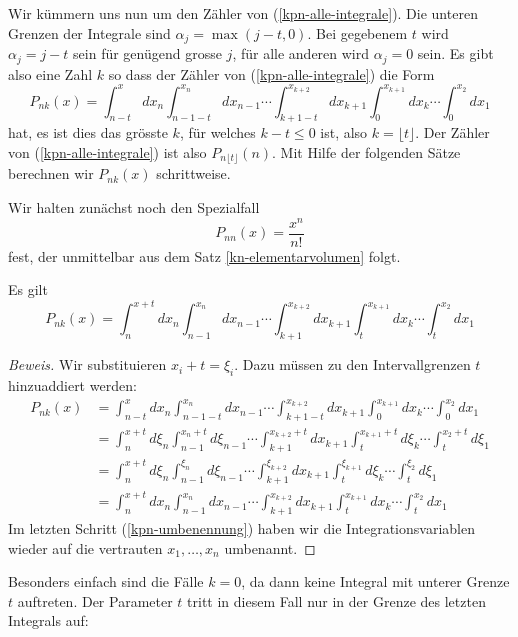 Wir kümmern uns nun um den Zähler von (\ref{kpn-alle-integrale}).
Die unteren Grenzen der Integrale sind $\alpha_j=\max(j-t,0)$.
Bei gegebenem $t$ wird $\alpha_j=j-t$
sein für genügend grosse $j$, für alle anderen wird $\alpha_j=0$ sein.
Es gibt also eine Zahl $k$ so dass der Zähler von (\ref{kpn-alle-integrale})
die Form
\[
P_{nk}(x)
=
\int_{n-t}^xdx_n\int_{n-1-t}^{x_n}dx_{n-1}\dotsi\int_{k+1-t}^{x_{k+2}}dx_{k+1}\int_0^{x_{k+1}}dx_k\dotsi\int_0^{x_2}dx_1
\]
hat, es ist dies das grösste $k$, für welches $k-t\le 0$ ist, also
$k=\lfloor t\rfloor$.
Der Zähler von (\ref{kpn-alle-integrale})
ist also $P_{n\lfloor t\rfloor}(n)$.
Mit Hilfe der folgenden Sätze berechnen wir $P_{nk}(x)$ schrittweise.

Wir halten zunächst noch den Spezialfall
\begin{equation}
P_{nn}(x)=\frac{x^n}{n!}
\label{spezialfall-pnn}
\end{equation}
fest, der unmittelbar aus dem Satz \ref{kn-elementarvolumen} folgt.

\begin{satz}
\label{kn-variablentransformation}
Es gilt
\begin{equation}
P_{nk}(x)=\int_{n}^{x+t}dx_n\int_{n-1}^{x_n}dx_{n-1}\dotsi\int_{k+1}^{x_{k+2}}dx_{k+1}\int_t^{x_{k+1}}dx_k\dotsi\int_t^{x_2}dx_1
\label{kpn-variablen-transformation}
\end{equation}
\end{satz}
\begin{proof}[Beweis]
Wir substituieren $x_i+t=\xi_i$.
Dazu müssen zu den Intervallgrenzen
$t$ hinzuaddiert werden:
\begin{align}
P_{nk}(x)
&=
\int_{n-t}^xdx_n\int_{n-1-t}^{x_n}dx_{n-1}\dotsi\int_{k+1-t}^{x_{k+2}}dx_{k+1}\int_0^{x_{k+1}}dx_k\dotsi\int_0^{x_2}dx_1
\nonumber\\
&=
\int_{n}^{x+t}d\xi_n\int_{n-1}^{x_n+t}d\xi_{n-1}\dotsi\int_{k+1}^{x_{k+2}+t}dx_{k+1}\int_t^{x_{k+1}+t}d\xi_k\dotsi\int_t^{x_2+t}d\xi_1
\nonumber\\
&=
\int_{n}^{x+t}d\xi_n\int_{n-1}^{\xi_n}d\xi_{n-1}\dotsi\int_{k+1}^{\xi_{k+2}}dx_{k+1}\int_t^{\xi_{k+1}}d\xi_k\dotsi\int_t^{\xi_2}d\xi_1
\nonumber\\
&=
\int_{n}^{x+t}dx_n\int_{n-1}^{x_n}dx_{n-1}\dotsi\int_{k+1}^{x_{k+2}}dx_{k+1}\int_t^{x_{k+1}}dx_k\dotsi\int_t^{x_2}dx_1
\label{kpn-umbenennung}
\end{align}
Im letzten Schritt (\ref{kpn-umbenennung}) haben wir die Integrationsvariablen
wieder auf die vertrauten $x_1,\dots,x_n$ umbenannt.
\end{proof}
Besonders einfach sind die Fälle $k=0$, da dann keine Integral mit
unterer Grenze $t$ auftreten.
Der Parameter $t$ tritt in diesem Fall nur
in der Grenze des letzten Integrals auf:

